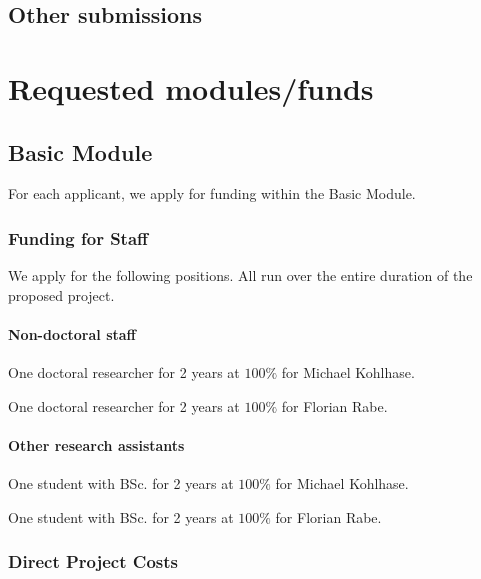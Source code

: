 \subsection{Other submissions}

\section{Requested modules/funds}

\subsection{Basic Module}

For each applicant, we apply for funding within the Basic Module.

\subsubsection{Funding for Staff}\label{sec:positions}
\label{sec:positions:research}

We apply for the following positions. All run over the entire duration of the proposed project.

\paragraph*{Non-doctoral staff}

One doctoral researcher for 2 years at $100 \%$ for Michael Kohlhase.

One doctoral researcher for 2 years at $100 \%$ for Florian Rabe.


\paragraph*{Other research assistants}

One student with BSc. for 2 years at $100 \%$ for Michael Kohlhase.

One student with BSc. for 2 years at $100 \%$ for Florian Rabe.

\subsubsection{Direct Project Costs}

